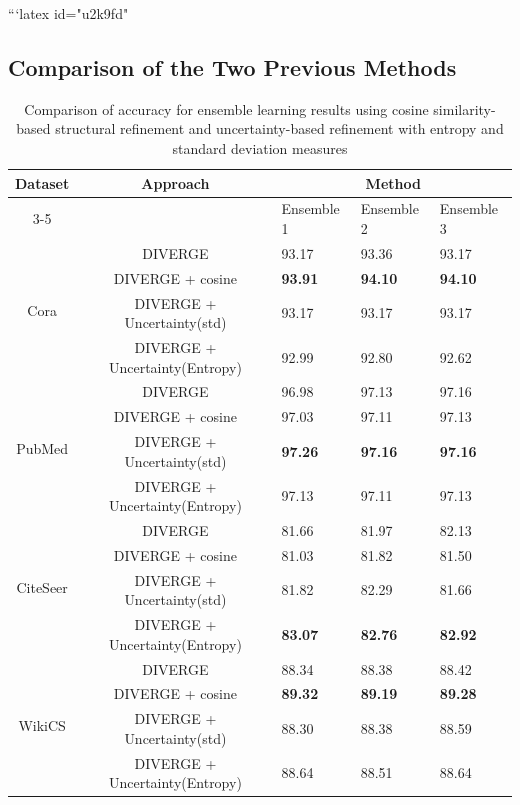 \documentclass{article}
\begin{document}
```latex id="u2k9fd"
\subsection{Comparison of the Two Previous Methods}

\begin{table}[ht]
\centering
\caption{Comparison of accuracy for ensemble learning results using cosine similarity-based structural refinement and uncertainty-based refinement with entropy and standard deviation measures}
\label{tab:accuracy_ensemble_after_enhancers}
\begin{tabularx}{\linewidth}{c c || *{3}{X}}
\hline
Dataset &
Approach &
\multicolumn{3}{c}{Method} \\
\cline{3-5}
 &  & Ensemble 1 & Ensemble 2 & Ensemble 3 \\
\hline

\multirow{4}{*}{Cora}
 & DIVERGE
 & 93.17 & 93.36 & 93.17 \\
\cline{2-5}
 & DIVERGE + cosine
 & \textbf{93.91} & \textbf{94.10} & \textbf{94.10} \\
\cline{2-5}
 & DIVERGE + Uncertainty(std)
 & 93.17 & 93.17 & 93.17 \\
\cline{2-5}
 & DIVERGE + Uncertainty(Entropy)
 & 92.99 & 92.80 & 92.62 \\
\hline
\hline

\multirow{4}{*}{PubMed}
 & DIVERGE
 & 96.98 & 97.13 & 97.16 \\
\cline{2-5}
 & DIVERGE + cosine
 & 97.03 & 97.11 & 97.13 \\
\cline{2-5}
 & DIVERGE + Uncertainty(std)
 & \textbf{97.26} & \textbf{97.16} & \textbf{97.16} \\
\cline{2-5}
 & DIVERGE + Uncertainty(Entropy)
 & 97.13 & 97.11 & 97.13 \\
\hline
\hline

\multirow{4}{*}{CiteSeer}
 & DIVERGE
 & 81.66 & 81.97 & 82.13 \\
\cline{2-5}
 & DIVERGE + cosine
 & 81.03 & 81.82 & 81.50 \\
\cline{2-5}
 & DIVERGE + Uncertainty(std)
 & 81.82 & 82.29 & 81.66 \\
\cline{2-5}
 & DIVERGE + Uncertainty(Entropy)
 & \textbf{83.07} & \textbf{82.76} & \textbf{82.92} \\
\hline
\hline

\multirow{4}{*}{WikiCS}
 & DIVERGE
 & 88.34 & 88.38 & 88.42 \\
\cline{2-5}
 & DIVERGE + cosine
 & \textbf{89.32} & \textbf{89.19} & \textbf{89.28} \\
\cline{2-5}
 & DIVERGE + Uncertainty(std)
 & 88.30 & 88.38 & 88.59 \\
\cline{2-5}
 & DIVERGE + Uncertainty(Entropy)
 & 88.64 & 88.51 & 88.64 \\
\hline

\end{tabularx}
\end{table}
\end{document}
